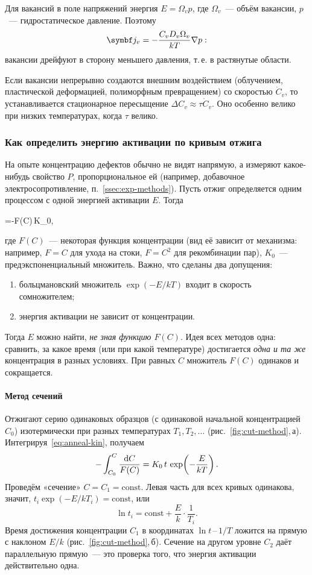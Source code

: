 Для вакансий в поле напряжений энергия $E=\Omega_vp$, где $\Omega_v$~—
объём вакансии, $p$~— гидростатическое давление. Поэтому
\[
\vb j_v=-\frac{C_vD_v\Omega_v}{kT}\nabla p:
\]
вакансии дрейфуют в сторону меньшего давления, т.\,е. в растянутые
области.

Если вакансии непрерывно создаются внешним воздействием (облучением,
пластической деформацией, полиморфным превращением) со скоростью
$\dot C_v$, то устанавливается стационарное пересыщение
$\Delta C_v\approx\tau\dot C_v$. Оно особенно велико при низких
температурах, когда $\tau$ велико.

\subsubsection{Как определить энергию активации по кривым отжига}

На опыте концентрацию дефектов обычно не видят напрямую, а измеряют
какое-нибудь свойство $P$, пропорциональное ей (например, добавочное
электросопротивление, п.~\ref{ssec:exp-methods}). Пусть отжиг определяется
одним процессом с одной энергией активации $E$. Тогда
\begin{keyeq}\label{eq:anneal-kin}
=-F(C)\,K_0,
\end{keyeq}
где $F(C)$~— некоторая функция концентрации (вид её зависит от механизма:
например, $F=C$ для ухода на стоки, $F=C^2$ для рекомбинации пар), $K_0$~—
предэкспоненциальный множитель. Важно, что сделаны два допущения:
\begin{enumerate}[label=\asbuk*)]
\item больцмановский множитель $\exp(-E/kT)$ входит в скорость
сомножителем;
\item энергия активации не зависит от концентрации.
\end{enumerate}
Тогда $E$ можно найти, \emph{не зная функцию $F(C)$}. Идея всех методов
одна: сравнить, за какое время (или при какой температуре) достигается
\emph{одна и та же} концентрация в разных условиях. При равных $C$
множитель $F(C)$ одинаков и сокращается.

\paragraph{Метод сечений}
Отжигают серию одинаковых образцов (с одинаковой начальной концентрацией
$C_0$) изотермически при разных температурах $T_1,T_2,\dots$
(рис.~\ref{fig:cut-method},\,а). Интегрируя~\eqref{eq:anneal-kin},
получаем
\[
-\int_{C_0}^{C}\frac{\mathop{}\!\mathrm{d} C}{F(C)}=K_0\,t\,\exp\!\left(-\frac{E}{kT}\right) .
\]
Проведём «сечение» $C=C_1=\text{const}$. Левая часть для всех кривых
одинакова, значит, $t_i\exp(-E/kT_i)=\text{const}$, или
\begin{equation}\label{eq:cut}
\ln t_i=\text{const}+\frac{E}{k}\cdot\frac{1}{T_i} .
\end{equation}
Время достижения концентрации $C_1$ в координатах $\ln t$\,--\,$1/T$
ложится на прямую с наклоном $E/k$ (рис.~\ref{fig:cut-method},\,б).
Сечение на другом уровне $C_2$ даёт параллельную прямую~— это проверка
того, что энергия активации действительно одна.

